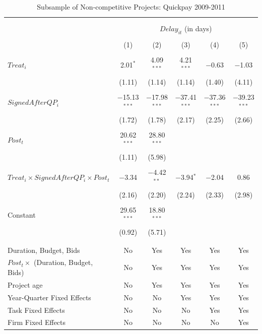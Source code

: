 \documentclass[
]{article}
\begin{document}
\begin{table}[H] \centering 
  \caption{Subsample of Non-competitive Projects: Quickpay 2009-2011} 
  \label{} 
\small 
\begin{tabular}{@{\extracolsep{-2pt}}lccccc} 
\\[-1.8ex]\hline 
\hline \\[-1.8ex] 
\\[-1.8ex] & \multicolumn{5}{c}{$Delay_{it}$ (in days)} \\ 
\\[-1.8ex] & (1) & (2) & (3) & (4) & (5)\\ 
\hline \\[-1.8ex] 
 $Treat_i$ & 2.01$^{*}$ & 4.09$^{***}$ & 4.21$^{***}$ & $-$0.63 & $-$1.03 \\ 
  & (1.11) & (1.14) & (1.14) & (1.40) & (4.11) \\ 
  & & & & & \\ 
 $SignedAfterQP_i$ & $-$15.13$^{***}$ & $-$17.98$^{***}$ & $-$37.41$^{***}$ & $-$37.36$^{***}$ & $-$39.23$^{***}$ \\ 
  & (1.72) & (1.78) & (2.17) & (2.25) & (2.66) \\ 
  & & & & & \\ 
 $Post_t$ & 20.62$^{***}$ & 28.80$^{***}$ &  &  &  \\ 
  & (1.11) & (5.98) &  &  &  \\ 
  & & & & & \\ 
 $Treat_i \times SignedAfterQP_i \times Post_t$ & $-$3.34 & $-$4.42$^{**}$ & $-$3.94$^{*}$ & $-$2.04 & 0.86 \\ 
  & (2.16) & (2.20) & (2.24) & (2.33) & (2.98) \\ 
  & & & & & \\ 
 Constant & 29.65$^{***}$ & 18.80$^{***}$ &  &  &  \\ 
  & (0.92) & (5.71) &  &  &  \\ 
  & & & & & \\ 
\hline \\[-1.8ex] 
Duration, Budget, Bids & No & Yes & Yes & Yes & Yes \\ 
$Post_t \times $  (Duration, Budget, Bids) & No & Yes & Yes & Yes & Yes \\ 
Project age & No & Yes & Yes & Yes & Yes \\ 
Year-Quarter Fixed Effects & No & No & Yes & Yes & Yes \\ 
Task Fixed Effects & No & No & No & Yes & Yes \\ 
Firm Fixed Effects & No & No & No & No & Yes \\ 

\end{tabular}
\end{table}
\end{document}
